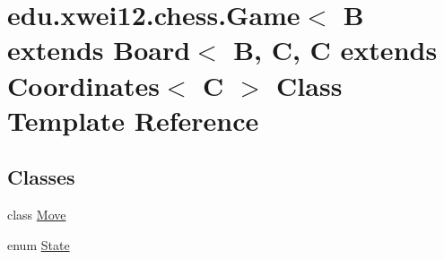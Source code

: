 \hypertarget{classedu_1_1xwei12_1_1chess_1_1_game}{}\section{edu.\+xwei12.\+chess.\+Game$<$ B extends Board$<$ B, C, C extends Coordinates$<$ C $>$ Class Template Reference}
\label{classedu_1_1xwei12_1_1chess_1_1_game}
\subsection*{Classes}
\begin{DoxyCompactItemize}
\item 
class \hyperlink{classedu_1_1xwei12_1_1chess_1_1_game_1_1_move}{Move}
\item 
enum \hyperlink{enumedu_1_1xwei12_1_1chess_1_1_game_1_1_state}{State}
\end{DoxyCompactItemize}
